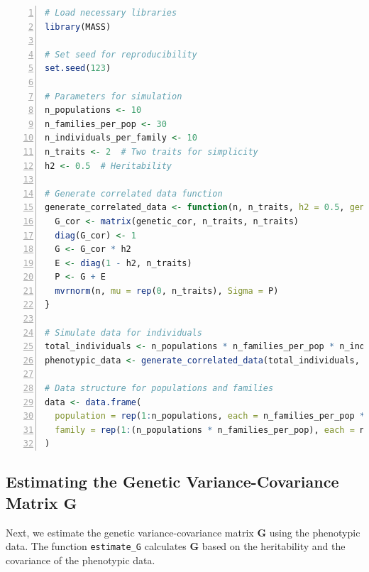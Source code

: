 \documentclass[12pt,a4paper]{article}
\begin{document}
\begin{lstlisting}[language=R, 
                   caption=Simulating Phenotypic Data,
                   basicstyle=\ttfamily\footnotesize,
                   keywordstyle=\color{blue},
                   stringstyle=\color{red},
                   commentstyle=\color{green!60!black},
                   numbers=left,
                   numberstyle=\tiny\color{gray},
                   frame=single,
                   breaklines=true,
                   linewidth=0.95\textwidth,
                   columns=flexible,
                   xleftmargin=0.05\textwidth,
                   xrightmargin=0.05\textwidth]
# Load necessary libraries
library(MASS)

# Set seed for reproducibility
set.seed(123)

# Parameters for simulation
n_populations <- 10
n_families_per_pop <- 30
n_individuals_per_family <- 10
n_traits <- 2  # Two traits for simplicity
h2 <- 0.5  # Heritability

# Generate correlated data function
generate_correlated_data <- function(n, n_traits, h2 = 0.5, genetic_cor = 0.3) {
  G_cor <- matrix(genetic_cor, n_traits, n_traits)
  diag(G_cor) <- 1
  G <- G_cor * h2
  E <- diag(1 - h2, n_traits)
  P <- G + E
  mvrnorm(n, mu = rep(0, n_traits), Sigma = P)
}

# Simulate data for individuals
total_individuals <- n_populations * n_families_per_pop * n_individuals_per_family
phenotypic_data <- generate_correlated_data(total_individuals, n_traits, h2 = h2)

# Data structure for populations and families
data <- data.frame(
  population = rep(1:n_populations, each = n_families_per_pop * n_individuals_per_family),
  family = rep(1:(n_populations * n_families_per_pop), each = n_individuals_per_family)
)
\end{lstlisting}

\subsection*{Estimating the Genetic Variance-Covariance Matrix \( \mathbf{G} \)}

Next, we estimate the genetic variance-covariance matrix \( \mathbf{G} \) using the phenotypic data. The function \texttt{estimate\_G} calculates \( \mathbf{G} \) based on the heritability and the covariance of the phenotypic data.
\end{document}

